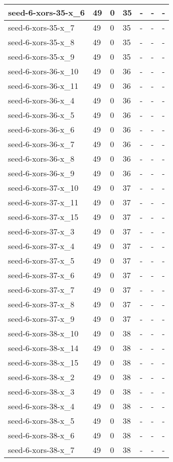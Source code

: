 \begin{scriptsize}
\begin{longtable}{|p{5cm}|l|l|l|l|l|l|}
seed-6-xors-35-x\_6&49&0&35&-&-&- \\ \hline 
seed-6-xors-35-x\_7&49&0&35&-&-&- \\ \hline 
seed-6-xors-35-x\_8&49&0&35&-&-&- \\ \hline 
seed-6-xors-35-x\_9&49&0&35&-&-&- \\ \hline 
seed-6-xors-36-x\_10&49&0&36&-&-&- \\ \hline 
seed-6-xors-36-x\_11&49&0&36&-&-&- \\ \hline 
seed-6-xors-36-x\_4&49&0&36&-&-&- \\ \hline 
seed-6-xors-36-x\_5&49&0&36&-&-&- \\ \hline 
seed-6-xors-36-x\_6&49&0&36&-&-&- \\ \hline 
seed-6-xors-36-x\_7&49&0&36&-&-&- \\ \hline 
seed-6-xors-36-x\_8&49&0&36&-&-&- \\ \hline 
seed-6-xors-36-x\_9&49&0&36&-&-&- \\ \hline 
seed-6-xors-37-x\_10&49&0&37&-&-&- \\ \hline 
seed-6-xors-37-x\_11&49&0&37&-&-&- \\ \hline 
seed-6-xors-37-x\_15&49&0&37&-&-&- \\ \hline 
seed-6-xors-37-x\_3&49&0&37&-&-&- \\ \hline 
seed-6-xors-37-x\_4&49&0&37&-&-&- \\ \hline 
seed-6-xors-37-x\_5&49&0&37&-&-&- \\ \hline 
seed-6-xors-37-x\_6&49&0&37&-&-&- \\ \hline 
seed-6-xors-37-x\_7&49&0&37&-&-&- \\ \hline 
seed-6-xors-37-x\_8&49&0&37&-&-&- \\ \hline 
seed-6-xors-37-x\_9&49&0&37&-&-&- \\ \hline 
seed-6-xors-38-x\_10&49&0&38&-&-&- \\ \hline 
seed-6-xors-38-x\_14&49&0&38&-&-&- \\ \hline 
seed-6-xors-38-x\_15&49&0&38&-&-&- \\ \hline 
seed-6-xors-38-x\_2&49&0&38&-&-&- \\ \hline 
seed-6-xors-38-x\_3&49&0&38&-&-&- \\ \hline 
seed-6-xors-38-x\_4&49&0&38&-&-&- \\ \hline 
seed-6-xors-38-x\_5&49&0&38&-&-&- \\ \hline 
seed-6-xors-38-x\_6&49&0&38&-&-&- \\ \hline 
seed-6-xors-38-x\_7&49&0&38&-&-&- \\ \hline 

\end{longtable}
\end{scriptsize}
